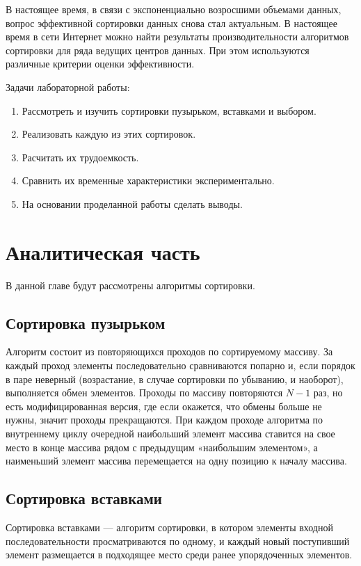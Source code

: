 \documentclass[14pt,russian]{scrartcl}
\begin{document}
В настоящее время, в связи с экспоненциально возросшими объемами данных, вопрос эффективной сортировки данных снова стал актуальным. В настоящее время в сети Интернет можно найти результаты производительности алгоритмов сортировки для ряда ведущих центров данных.
При этом используются различные критерии оценки эффективности. 

Задачи лабораторной работы:

\begin{enumerate}
    \item Рассмотреть и изучить сортировки пузырьком, вставками и выбором.
    \item Реализовать каждую из этих сортировок.
    \item Расчитать их трудоемкость.
    \item Сравнить их временные характеристики экспериментально.
    \item На основании проделанной работы сделать выводы.
\end{enumerate}

\section{Аналитическая часть}
В данной главе будут рассмотрены алгоритмы сортировки.

\subsection{Сортировка пузырьком}


Алгоритм состоит из повторяющихся проходов по сортируемому массиву. За каждый проход элементы последовательно сравниваются попарно и, если порядок в паре неверный (возрастание, в случае сортировки по убыванию, и наоборот), выполняется обмен элементов. Проходы по массиву повторяются $N - 1$ раз, но есть модифицированная версия, где если окажется, что обмены больше не нужны, значит проходы прекращаются. При каждом проходе алгоритма по внутреннему циклу очередной наибольший элемент массива ставится на свое место в конце массива рядом с предыдущим «наибольшим элементом», а наименьший элемент массива перемещается на одну позицию к началу массива.

\subsection{Сортировка вставками}

Сортировка вставками — алгоритм сортировки, в котором элементы входной последовательности просматриваются по одному, и каждый новый поступивший элемент размещается в подходящее место среди ранее упорядоченных элементов.
\end{document}
